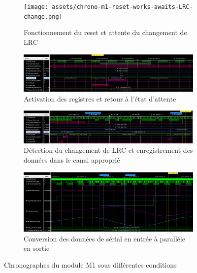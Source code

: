 
\begin{figure}[H]
  \centering
  \begin{subfigure}{.496\linewidth}
    \centering
    \texttt{[image: assets/chrono-m1-reset-works-awaits-LRC-change.png]}
    \caption{Fonctionnement du reset et attente du changement de LRC}
    \label{fig:chrono-m1-reset-works-awaits-LRC-change}
  \end{subfigure}
  \begin{subfigure}{.496\linewidth}
    \centering
    \includegraphics[width=\textwidth]{assets/chrono-m1-param-enable-reg-activation-return-await.png}
    \caption{Activation des registres et retour à l'état d'attente}
    \label{fig:chrono-m1-param-enable-reg-activation-return-await}
  \end{subfigure}
  \begin{subfigure}{.496\linewidth}
    \centering
    \includegraphics[width=\textwidth]{assets/chrono-m1-detect-change-LRC-save-output-to-channel.png}
    \caption{Détection du changement de LRC et enregistrement des données dans le canal approprié}
    \label{fig:chrono-m1-detect-change-LRC-save-output-to-channel}
  \end{subfigure}
  \begin{subfigure}{.496\linewidth}
    \centering
    \includegraphics[width=\textwidth]{assets/chrono-m1-input-becomes-output.png}
    \caption{Conversion des données de sérial en entrée à parallèle en sortie}
    \label{fig:chrono-m1-input-becomes-output}
  \end{subfigure}
  \caption{Chronographes du module M1 sous différentes conditions}
\end{figure}





